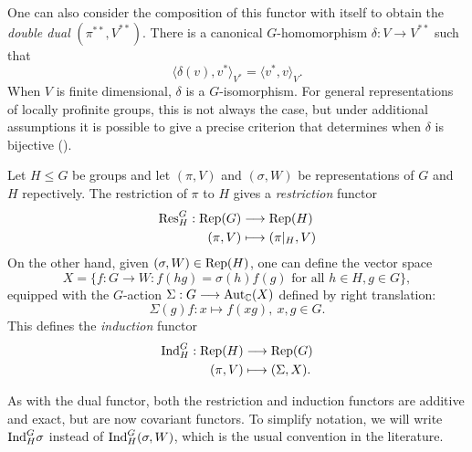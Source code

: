 One can also consider the composition of this functor with itself to obtain the \textit{double dual} $(\pi^{**},V^{**})$. There is a canonical $G$-homomorphism $\delta:V\rightarrow V^{**}$ such that $$\langle\delta(v),v^*\rangle_{V^*}=\langle v^*,v\rangle_{V}.$$
When $V$ is finite dimensional, $\delta$ is a $G$-isomorphism. For general representations of locally profinite groups, this is not always the case, but under additional assumptions it is possible to give a precise criterion that determines when $\delta$ is bijective (\cite[Corollary 2.8, Proposition 2.9]{BH1}).


\begin{defn}\label{def:absresind}
    Let $H\leq G$ be groups and let $(\pi,V)$ and $(\sigma,W)$ be representations of $G$ and $H$ repectively. The restriction of $\pi$ to $H$ gives a \textit{restriction} functor
    \begin{align*}
        \mathrm{Res}_H^G:\mathrm{Rep}(G)&\longrightarrow\mathrm{Rep}(H)\\
        (\pi,V)&\longmapsto(\pi|_H,V)
    \end{align*}
    On the other hand, given $(\sigma,W)\in\mathrm{Rep}(H)$, one can define the vector space
    $$X=\{f:G\to W:f(hg)=\sigma(h)f(g)\text{ for all }h\in H, g\in G\},$$
    equipped with the $G$-action $\Sigma:G\longrightarrow\mathrm{Aut}_{\mathbb{C}}(X)$ defined by right translation:
    $$\Sigma(g)f:x\longmapsto f(xg),\ x,g\in G.$$
    This defines the \textit{induction} functor
    \begin{align*}
        \mathrm{Ind}_H^G:\mathrm{Rep}(H)&\longrightarrow\mathrm{Rep}(G)\\
        (\pi,V)&\longmapsto(\Sigma,X).
    \end{align*}
\end{defn}

As with the dual functor, both the restriction and induction functors are additive and exact, but are now covariant functors. To simplify notation, we will write $\mathrm{Ind}_H^G\sigma$ instead of $\mathrm{Ind}_H^G(\sigma,W)$, which is the usual convention in the literature.

